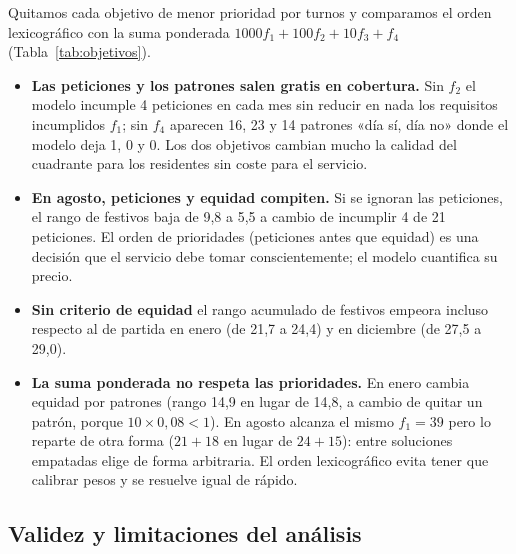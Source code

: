 Quitamos cada objetivo de menor prioridad por turnos y comparamos el orden lexicográfico con la suma ponderada $1000 f_1 + 100 f_2 + 10 f_3 + f_4$ (Tabla~\ref{tab:objetivos}).



\begin{itemize}
  \item \textbf{Las peticiones y los patrones salen gratis en cobertura.} Sin $f_2$ el modelo incumple 4 peticiones en cada mes sin reducir en nada los requisitos incumplidos $f_1$; sin $f_4$ aparecen 16, 23 y 14 patrones «día sí, día no» donde el modelo deja 1, 0 y 0. Los dos objetivos cambian mucho la calidad del cuadrante para los residentes sin coste para el servicio.
  \item \textbf{En agosto, peticiones y equidad compiten.} Si se ignoran las peticiones, el rango de festivos baja de 9,8 a 5,5 a cambio de incumplir 4 de 21 peticiones. El orden de prioridades (peticiones antes que equidad) es una decisión que el servicio debe tomar conscientemente; el modelo cuantifica su precio.
  \item \textbf{Sin criterio de equidad} el rango acumulado de festivos empeora incluso respecto al de partida en enero (de 21,7 a 24,4) y en diciembre (de 27,5 a 29,0).
  \item \textbf{La suma ponderada no respeta las prioridades.} En enero cambia equidad por patrones (rango 14,9 en lugar de 14,8, a cambio de quitar un patrón, porque $10 \times 0{,}08 < 1$). En agosto alcanza el mismo $f_1 = 39$ pero lo reparte de otra forma ($21 + 18$ en lugar de $24 + 15$): entre soluciones empatadas elige de forma arbitraria. El orden lexicográfico evita tener que calibrar pesos y se resuelve igual de rápido.
\end{itemize}

\subsection{Validez y limitaciones del análisis}

